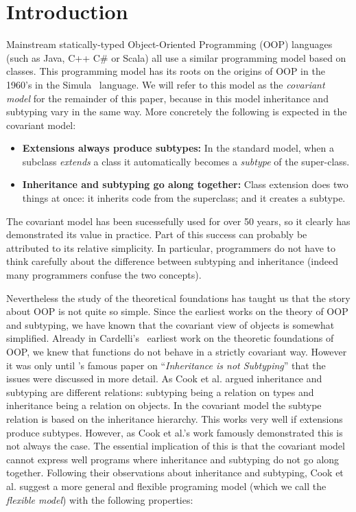 \section{Introduction}
\label{sec:intro}

Mainstream statically-typed Object-Oriented Programming (OOP) languages (such as Java,
C++ C\# or Scala) all use a similar programming model based on
classes. This programming model has its roots on the
origins of OOP in the 1960's in the Simula~\cite{dahl1967simula} language.
We will refer to this model as the \emph{covariant model} for the
remainder of this paper, because in this model inheritance and
subtyping vary in the same way. More concretely
the following is expected in the covariant model:

\begin{itemize}

\item {\bf Extensions always produce subtypes:} In the standard model, when a 
subclass \emph{extends} a class it automatically becomes a 
\emph{subtype} of the super-class. 

\item{\bf Inheritance and subtyping go along together:}
Class extension does two things at once: it inherits code from the
superclass; and it creates a subtype. 

\end{itemize}

The covariant model has been sucessefully used for over 50 years,
so it clearly has demonstrated its value in practice. 
Part of this success can probably be attributed 
to its relative simplicity. In particular, programmers do not have to think carefully 
about the difference between subtyping and inheritance (indeed many
programmers confuse the two concepts). 

Nevertheless the study of the theoretical foundations has
taught us that the story about OOP is not quite so simple. Since the
earliest works on the theory of OOP and subtyping, we have known that 
the covariant view of objects is somewhat simplified. Already in
Cardelli's~\cite{} earliest work on the theoretic foundations of OOP,
we knew that functions do not behave in a strictly covariant way. 
However it was only until \citet{cook1989inheritance}'s famous paper on
``\emph{Inheritance is not Subtyping}'' that the issues were discussed 
in more detail. As Cook et al. argued inheritance and
subtyping are different relations: subtyping being a relation on types 
and inheritance being a relation on objects. In the covariant model 
the subtype relation is based on the inheritance hierarchy. This 
works very well if extensions produce 
subtypes. However, as Cook et al.'s work famously demonstrated 
this is not always the case. The essential implication of this is that
the covariant model cannot express well programs where inheritance 
and subtyping do not go along together. Following their observations about 
inheritance and subtyping, Cook et al. suggest a more general and 
flexible programing model (which we call the \emph{flexible model}) with the following properties:

